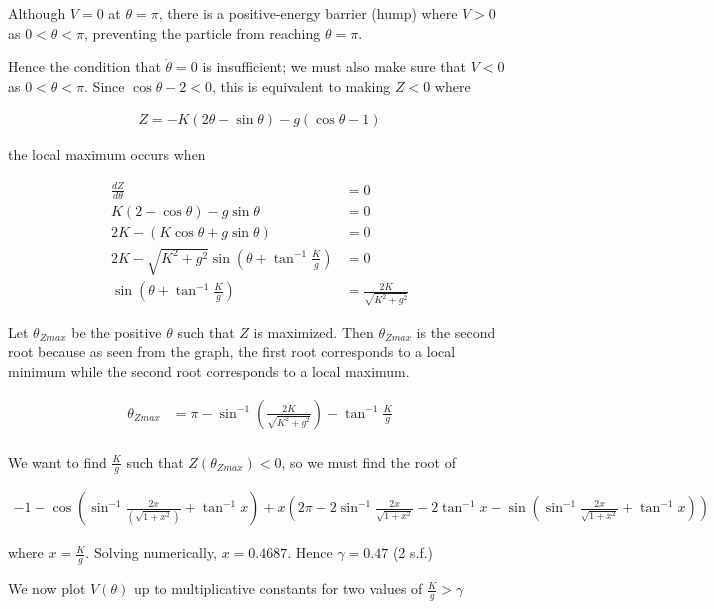 \documentclass{article}
\begin{document}
Although $V = 0$ at $\theta = \pi$, there is a positive-energy barrier (hump) where $V > 0$ as $0 < \theta < \pi$, preventing the particle from reaching $\theta = \pi$.

Hence the condition that $\dot\theta = 0$ is insufficient; we must also make sure that $V < 0$ as $0 < \theta < \pi$. Since $\cos\theta - 2 < 0$, this is equivalent to making $Z < 0$ where

\begin{align*}
Z = -K(2\theta - \sin\theta) - g(\cos\theta - 1)
\end{align*}

the local maximum occurs when

\begin{align*}
\frac{dZ}{d\theta} &= 0 \\
K(2 - \cos\theta) - g\sin\theta &= 0 \\
2K - (K\cos\theta + g\sin\theta) &= 0 \\
2K - \sqrt{K^2 + g^2}\sin(\theta + \tan^{-1}\frac{K}{g}) &= 0 \\
\sin(\theta + \tan^{-1}\frac{K}{g}) &= \frac{2K}{\sqrt{K^2 + g^2}}
\end{align*}

Let $\theta_{Zmax}$ be the positive $\theta$ such that $Z$ is maximized. Then $\theta_{Zmax}$ is the second root because as seen from the graph, the first root corresponds to a local minimum while the second root corresponds to a local maximum. 

\begin{align*}
\theta_{Zmax} &= \pi - \sin^{-1}(\frac{2K}{\sqrt{K^2 + g^2}}) - \tan^{-1}\frac{K}{g}\\
\end{align*}

We want to find $\frac{K}{g}$ such that $Z(\theta_{Zmax}) < 0$, so we must find the root of

\begin{align*}
-1 - \cos\left(\sin^{-1}\frac{2x}{(\sqrt{1+x^2})} + \tan^{-1}x\right) + x\left(2\pi - 2\sin^{-1}\frac{2x}{\sqrt{1+x^2}} - 2\tan^{-1}x - \sin(\sin^{-1}\frac{2x}{\sqrt{1+x^2}} + \tan^{-1}x)\right)
\end{align*}

where $x = \frac{K}{g}$. Solving numerically, $x = 0.4687$. Hence $\gamma = 0.47$ (2 s.f.)

We now plot $V(\theta)$ up to multiplicative constants for two values of $\frac{K}{g} > \gamma$
\end{document}
